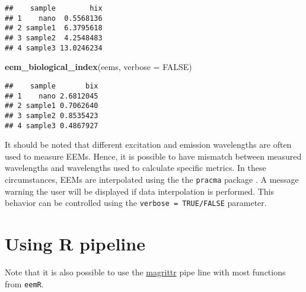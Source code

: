 \documentclass[]{book}
\newenvironment{Shaded}{\begin{snugshade}}{\end{snugshade}}
\newcommand{\KeywordTok}[1]{\textcolor[rgb]{0.13,0.29,0.53}{\textbf{{#1}}}}
\newcommand{\DataTypeTok}[1]{\textcolor[rgb]{0.13,0.29,0.53}{{#1}}}
\newcommand{\DecValTok}[1]{\textcolor[rgb]{0.00,0.00,0.81}{{#1}}}
\newcommand{\StringTok}[1]{\textcolor[rgb]{0.31,0.60,0.02}{{#1}}}
\newcommand{\OtherTok}[1]{\textcolor[rgb]{0.56,0.35,0.01}{{#1}}}
\newcommand{\NormalTok}[1]{{#1}}
\begin{document}
\begin{verbatim}
##    sample        hix
## 1    nano  0.5568136
## 2 sample1  6.3795618
## 3 sample2  4.2548483
## 4 sample3 13.0246234
\end{verbatim}

\begin{Shaded}
\begin{Highlighting}[]
\KeywordTok{eem_biological_index}\NormalTok{(eems, }\DataTypeTok{verbose =} \OtherTok{FALSE}\NormalTok{)}
\end{Highlighting}
\end{Shaded}

\begin{verbatim}
##    sample       bix
## 1    nano 2.6812045
## 2 sample1 0.7062640
## 3 sample2 0.8535423
## 4 sample3 0.4867927
\end{verbatim}

It should be noted that different excitation and emission wavelengths
are often used to measure EEMs. Hence, it is possible to have mismatch
between measured wavelengths and wavelengths used to calculate specific
metrics. In these circumstances, EEMs are interpolated using the the
\texttt{pracma} package \citep{Borchers2015}. A message warning the user
will be displayed if data interpolation is performed. This behavior can
be controlled using the \texttt{verbose\ =\ TRUE/FALSE} parameter.

\section{Using R pipeline}\label{using-r-pipeline}

Note that it is also possible to use the
\href{https://cran.r-project.org/web/packages/magrittr/vignettes/magrittr.html}{magrittr}
pipe line with most functions from \texttt{eemR}.

\begin{Shaded}
\end{Shaded}


\end{document}
